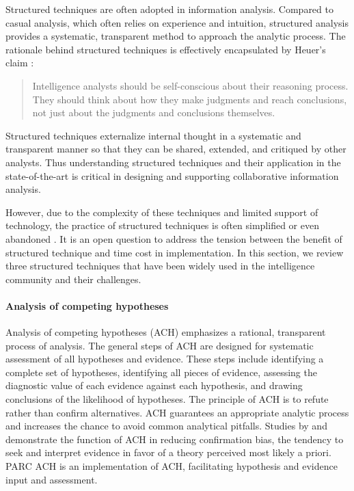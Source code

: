 Structured techniques are often adopted in information analysis. Compared to casual analysis, which often relies on experience and intuition, structured analysis provides a systematic, transparent method to approach the analytic process. The rationale behind structured techniques is effectively encapsulated by Heuer's claim \cite[p.31]{Heuer1999}: 

\begin{quote}
	Intelligence analysts should be self-conscious about their reasoning process. They should think about how they make judgments and reach conclusions, not just about the judgments and conclusions themselves.
\end{quote}

Structured techniques externalize internal thought in a systematic and transparent manner so that they can be shared, extended, and critiqued by other analysts. Thus understanding structured techniques and their application in the state-of-the-art is critical in designing and supporting collaborative information analysis. 

However, due to the complexity of these techniques and limited support of technology, the practice of structured techniques is often simplified or even abandoned \citep{Chin2009, Wright2006}. It is an open question to address the tension between the benefit of structured technique and time cost in implementation. In this section, we review three structured techniques that have been widely used in the intelligence community and their challenges.

\paragraph{Analysis of competing hypotheses}
Analysis of competing hypotheses (ACH) \citep{Heuer1999} emphasizes a rational, transparent process of analysis. The general steps of ACH are designed for systematic assessment of all hypotheses and evidence. These steps include identifying a complete set of hypotheses, identifying all pieces of evidence, assessing the diagnostic value of each evidence against each hypothesis, and drawing conclusions of the likelihood of hypotheses. The principle of ACH is to refute rather than confirm alternatives. ACH guarantees an appropriate analytic process and increases the chance to avoid common analytical pitfalls. Studies by \cite{Lehner2008} and \cite{Lord1979} demonstrate the function of ACH in reducing confirmation bias, the tendency to seek and interpret evidence in favor of a theory perceived most likely a priori. PARC ACH \citep{PARC} is an implementation of ACH, facilitating hypothesis and evidence input and assessment. 

